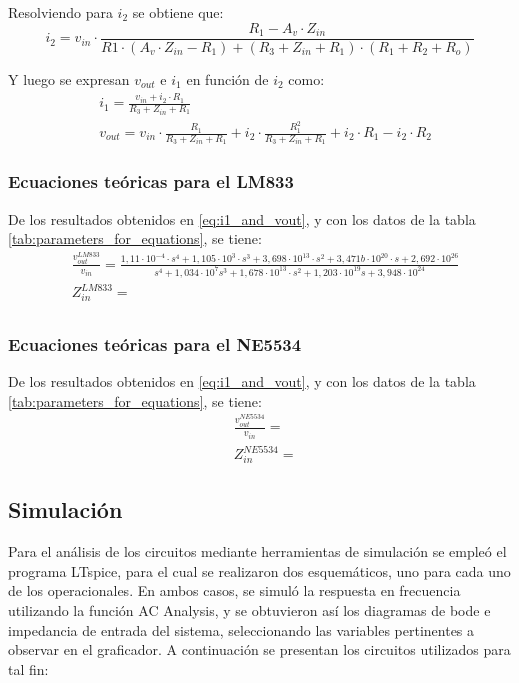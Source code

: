 Resolviendo para $i_2$ se obtiene que:
\begin{equation}
    i_2 = v_{in} \cdot \frac{R_1 - A_v \cdot Z_{in}}{R1 \cdot \left(A_v \cdot Z_{in} - R_1\right) + \left(R_3 + Z_{in} + R_1\right) \cdot \left(R_1 + R_2 + R_o\right)}
    \label{eq:i2}
\end{equation}

Y luego se expresan $v_{out}$ e $i_1$ en función de $i_2$ como:
\begin{align}
    \label{eq:i1_and_vout}
    &i_1 = \frac{v_{in} + i_2 \cdot R_1}{R_3 + Z_{in} + R_1} \\
    &v_{out} = v_{in} \cdot \frac{R_1}{R_3 + Z_{in} + R_1} + i_2 \cdot \frac{R_1^2}{R_3 + Z_{in} + R_1} + i_2 \cdot R_1 - i_2 \cdot R_2
\end{align}

\subsubsection{Ecuaciones teóricas para el LM833}
De los resultados obtenidos en \ref{eq:i1_and_vout}, y con los datos de la tabla \ref{tab:parameters_for_equations}, se tiene:
\begin{align}
    & \frac{v_{out}^{LM833}}{v_{in}} = \frac{1,11 \cdot 10^{-4} \cdot s^{4} + 1,105 \cdot 10^{3} \cdot s^{3} + 3,698 \cdot 10^{13} \cdot s^{2} + 3,471b\cdot 10^{20} \cdot s + 2,692 \cdot 10^{26}}
    {s^{4} + 1,034 \cdot 10^{7} s^{3} + 1,678 \cdot 10^{13} \cdot s^{2} + 1,203 \cdot 10^{19} s + 3,948 \cdot 10^{24}} \label{eq:LM833_transfer_fun} \\
    & Z_{in}^{LM833} = \label{eq:LM833_in_impedance} \\
\end{align}

\subsubsection{Ecuaciones teóricas para el NE5534}
De los resultados obtenidos en \ref{eq:i1_and_vout}, y con los datos de la tabla \ref{tab:parameters_for_equations}, se tiene:
\begin{align}
    & \frac{v_{out}^{NE5534}}{v_{in}} = \label{eq:NE5534_transfer_fun} \\
    & Z_{in}^{NE5534} = \label{eq:NE5534_in_impedance}
\end{align}


\subsection{Simulación}
Para el análisis de los circuitos mediante herramientas de simulación se empleó el programa LTspice, para el cual se realizaron dos esquemáticos, uno para cada uno de los operacionales.
En ambos casos, se simuló la respuesta en frecuencia utilizando la función AC Analysis, y se obtuvieron así los diagramas de bode e impedancia de entrada del sistema, seleccionando las variables pertinentes a observar en el graficador.
A continuación se presentan los circuitos utilizados para tal fin:

